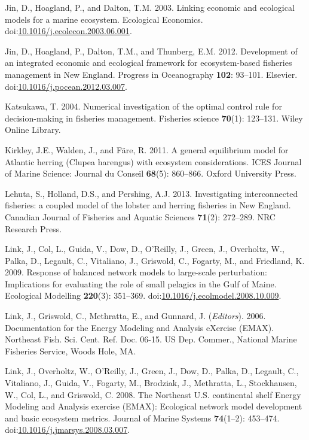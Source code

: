 \documentclass[]{article}
\begin{document}
\hypertarget{ref-Jin2003LinkingEcosystem}{}
Jin, D., Hoagland, P., and Dalton, T.M. 2003. Linking economic and
ecological models for a marine ecosystem. Ecological Economics.
doi:\href{https://doi.org/10.1016/j.ecolecon.2003.06.001}{10.1016/j.ecolecon.2003.06.001}.

\hypertarget{ref-Jin2012DevelopmentEngland}{}
Jin, D., Hoagland, P., Dalton, T.M., and Thunberg, E.M. 2012.
Development of an integrated economic and ecological framework for
ecosystem-based fisheries management in New England. Progress in
Oceanography \textbf{102}: 93--101. Elsevier.
doi:\href{https://doi.org/10.1016/j.pocean.2012.03.007}{10.1016/j.pocean.2012.03.007}.

\hypertarget{ref-katsukawa2004numerical}{}
Katsukawa, T. 2004. Numerical investigation of the optimal control rule
for decision-making in fisheries management. Fisheries science
\textbf{70}(1): 123--131. Wiley Online Library.

\hypertarget{ref-Kirkley2011AConsiderations}{}
Kirkley, J.E., Walden, J., and Färe, R. 2011. A general equilibrium
model for Atlantic herring (Clupea harengus) with ecosystem
considerations. ICES Journal of Marine Science: Journal du Conseil
\textbf{68}(5): 860--866. Oxford University Press.

\hypertarget{ref-Lehuta2013InvestigatingEngland}{}
Lehuta, S., Holland, D.S., and Pershing, A.J. 2013. Investigating
interconnected fisheries: a coupled model of the lobster and herring
fisheries in New England. Canadian Journal of Fisheries and Aquatic
Sciences \textbf{71}(2): 272--289. NRC Research Press.

\hypertarget{ref-link_response_2009}{}
Link, J., Col, L., Guida, V., Dow, D., O'Reilly, J., Green, J.,
Overholtz, W., Palka, D., Legault, C., Vitaliano, J., Griswold, C.,
Fogarty, M., and Friedland, K. 2009. Response of balanced network models
to large-scale perturbation: Implications for evaluating the role of
small pelagics in the Gulf of Maine. Ecological Modelling
\textbf{220}(3): 351--369.
doi:\href{https://doi.org/10.1016/j.ecolmodel.2008.10.009}{10.1016/j.ecolmodel.2008.10.009}.

\hypertarget{ref-link_documentation_2006}{}
Link, J., Griswold, C., Methratta, E., and Gunnard, J. (\emph{Editors}).
2006. Documentation for the Energy Modeling and Analysis eXercise
(EMAX). Northeast Fish. Sci. Cent. Ref. Doc. 06-15. US Dep. Commer.,
National Marine Fisheries Service, Woods Hole, MA.

\hypertarget{ref-link_northeast_2008}{}
Link, J., Overholtz, W., O'Reilly, J., Green, J., Dow, D., Palka, D.,
Legault, C., Vitaliano, J., Guida, V., Fogarty, M., Brodziak, J.,
Methratta, L., Stockhausen, W., Col, L., and Griswold, C. 2008. The
Northeast U.S. continental shelf Energy Modeling and Analysis exercise
(EMAX): Ecological network model development and basic ecosystem
metrics. Journal of Marine Systems \textbf{74}(1--2): 453--474.
doi:\href{https://doi.org/10.1016/j.jmarsys.2008.03.007}{10.1016/j.jmarsys.2008.03.007}.
\end{document}
